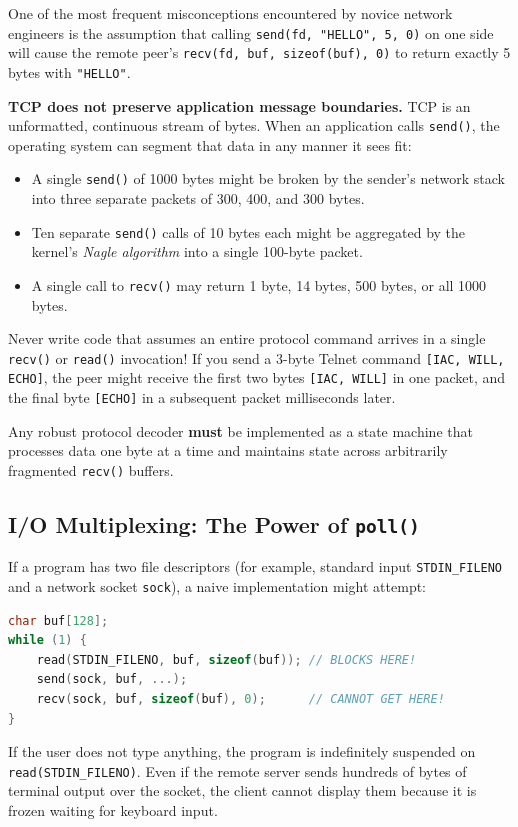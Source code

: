 One of the most frequent misconceptions encountered by novice network engineers is the assumption that calling \texttt{send(fd, "HELLO", 5, 0)} on one side will cause the remote peer's \texttt{recv(fd, buf, sizeof(buf), 0)} to return exactly 5 bytes with \texttt{"HELLO"}.

\textbf{TCP does not preserve application message boundaries.} TCP is an unformatted, continuous stream of bytes. When an application calls \texttt{send()}, the operating system can segment that data in any manner it sees fit:
\begin{itemize}[leftmargin=1.5em]
    \item A single \texttt{send()} of 1000 bytes might be broken by the sender's network stack into three separate packets of 300, 400, and 300 bytes.
    \item Ten separate \texttt{send()} calls of 10 bytes each might be aggregated by the kernel's \textit{Nagle algorithm} into a single 100-byte packet.
    \item A single call to \texttt{recv()} may return 1 byte, 14 bytes, 500 bytes, or all 1000 bytes.
\end{itemize}

\begin{commonpitfall}
Never write code that assumes an entire protocol command arrives in a single \texttt{recv()} or \texttt{read()} invocation! If you send a 3-byte Telnet command \texttt{[IAC, WILL, ECHO]}, the peer might receive the first two bytes \texttt{[IAC, WILL]} in one packet, and the final byte \texttt{[ECHO]} in a subsequent packet milliseconds later. 

Any robust protocol decoder \textbf{must} be implemented as a state machine that processes data one byte at a time and maintains state across arbitrarily fragmented \texttt{recv()} buffers.
\end{commonpitfall}

\subsection{I/O Multiplexing: The Power of \texttt{poll()}}

If a program has two file descriptors (for example, standard input \texttt{STDIN\_FILENO} and a network socket \texttt{sock}), a naive implementation might attempt:
\begin{lstlisting}[language=C]
char buf[128];
while (1) {
    read(STDIN_FILENO, buf, sizeof(buf)); // BLOCKS HERE!
    send(sock, buf, ...);
    recv(sock, buf, sizeof(buf), 0);      // CANNOT GET HERE!
}
\end{lstlisting}
If the user does not type anything, the program is indefinitely suspended on \texttt{read(STDIN\_FILENO)}. Even if the remote server sends hundreds of bytes of terminal output over the socket, the client cannot display them because it is frozen waiting for keyboard input.

